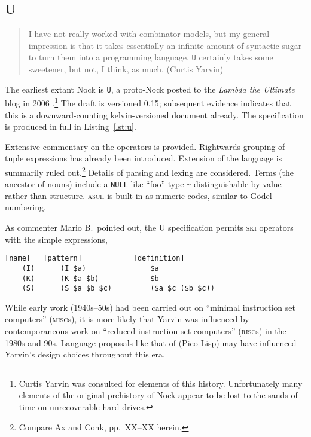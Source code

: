 \documentclass[twoside]{article}
\begin{document}
\subsection{U}

\begin{quote}
I have not really worked with combinator models, but my general impression is that it takes essentially an infinite amount of syntactic sugar to turn them into a programming language. \texttt{U} certainly takes some sweetener, but not, I think, as much.  (Curtis Yarvin)
\end{quote}

The earliest extant Nock is \texttt{U}, a proto-Nock posted to the \textit{Lambda the Ultimate} blog in 2006 \citep{Yarvin2006}.\footnote{Curtis Yarvin was consulted for elements of this history.  Unfortunately many elements of the original prehistory of Nock appear to be lost to the sands of time on unrecoverable hard drives.}  The draft is versioned 0.15; subsequent evidence indicates that this is a downward-counting kelvin-versioned document already.  The specification is produced in full in Listing~\ref{lst:u}.

Extensive commentary on the operators is provided.  Rightwards grouping of tuple expressions has already been introduced.  Extension of the language is summarily ruled out.\footnote{Compare Ax and Conk, pp.~XX–XX herein.}  Details of parsing and lexing are considered.  Terms (the ancestor of nouns) include a \texttt{NULL}-like ``foo'' type \texttt{\textasciitilde} distinguishable by value rather than structure.  \textsc{ascii} is built in as numeric codes, similar to G\"{o}del numbering.

As commenter Mario B.\ pointed out, the U specification permits \textsc{ski} operators with the simple expressions,

\begin{lstlisting}[style=listingcode]
   [name]   [pattern]            [definition]
    (I)      (I $a)               $a
    (K)      (K $a $b)            $b
    (S)      (S $a $b $c)         ($a $c ($b $c))
\end{lstlisting}

While early work (1940s--50s) had been carried out on ``minimal instruction set computers'' (\textsc{misc}s), it is more likely that Yarvin was influenced by contemporaneous work on ``reduced instruction set computers'' (\textsc{risc}s) in the 1980s and 90s.  Language proposals like that of \citet{Burger2006} (Pico Lisp) may have influenced Yarvin's design choices throughout this era.
\end{document}
